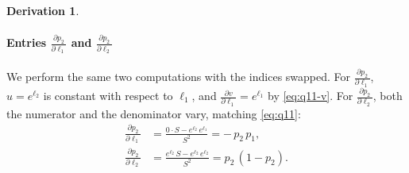 \documentclass[letterpaper, 10 pt, conference]{ieeeconf}
\newcommand{\pdv}[2]{\frac{\partial #1}{\partial #2}}
\theoremstyle{definition}
\newtheorem*{derivation}{Derivation}
\begin{document}
\begin{derivation}
  \paragraph{Entries $\pdv{p_2}{\ell_1}$ and $\pdv{p_2}{\ell_2}$}
  We perform the same two computations with the indices swapped. For $\pdv{p_2}{\ell_1}$, $u = e^{\ell_2}$ is constant with respect to $\ell_1$, and $\pdv{v}{\ell_1} = e^{\ell_1}$ by \eqref{eq:q11-v}. For $\pdv{p_2}{\ell_2}$, both the numerator and the denominator vary, matching \eqref{eq:q11}:
  \begin{align}
    \pdv{p_2}{\ell_1}
     & = \frac{0 \cdot S - e^{\ell_2}\,e^{\ell_1}}{S^{2}}
    = -\,p_2\,p_1,
    \label{eq:q21}                                            \\
    \pdv{p_2}{\ell_2}
     & = \frac{e^{\ell_2}\,S - e^{\ell_2}\,e^{\ell_2}}{S^{2}}
    = p_2\,(1 - p_2).
    \label{eq:q22}
  \end{align}


\end{derivation}
\end{document}
